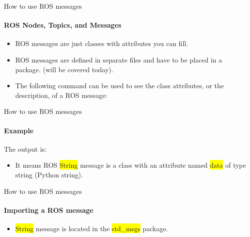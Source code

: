 \documentclass{beamer}
\begin{document}
\begin{frame}{How to use ROS messages}
    \framesubtitle{ROS Nodes, Topics, and Messages}
    \begin{itemize}
        \item ROS messages are just classes with attributes you can fill.
        
        \item ROS messages are defined in separate files and have to be placed in a package. (will be covered today).
        
        \item The following command can be used to see the class attributes, or the description, of a ROS message:
        
        \begin{terminal}
            \color{green} 
        \end{terminal}
    \end{itemize}
    
\end{frame}


\begin{frame}{How to use ROS messages}
    \framesubtitle{Example}

        \begin{terminal}
            \color{green} 
        \end{terminal}

    The output is:
    
            \begin{terminal}
                \color{green} 
                
            \end{terminal}
   
   \begin{itemize}
       \item It means ROS {\ttfamily \colorbox{yellow}{String}} message is a class with an attribute named {\ttfamily \colorbox{yellow}{data}} of type string (Python string).
   \end{itemize} 
\end{frame}


\begin{frame}{How to use ROS messages}
    \framesubtitle{Importing a ROS message}
    
    
    \begin{itemize}
        \item {\ttfamily \colorbox{yellow}{String}} message is located in the {\ttfamily \colorbox{yellow}{std\_msgs}} package.
    \end{itemize} 
\end{frame}
\end{document}
